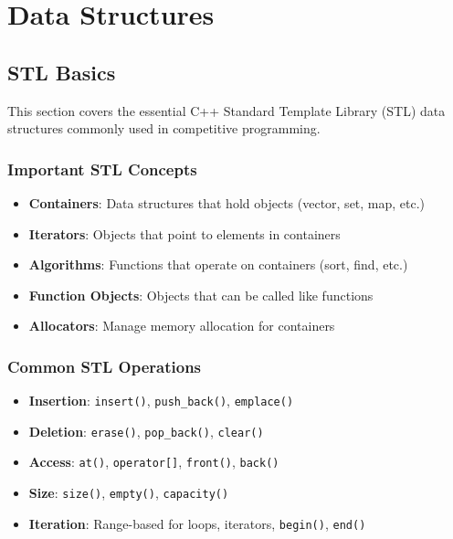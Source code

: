 \documentclass[11pt,a4paper]{article}
\begin{document}
\newpage

\section{Data Structures}

\subsection{STL Basics}
This section covers the essential C++ Standard Template Library (STL) data structures commonly used in competitive programming.

\subsubsection{Important STL Concepts}

\begin{itemize}
\item \textbf{Containers}: Data structures that hold objects (vector, set, map, etc.)
\item \textbf{Iterators}: Objects that point to elements in containers
\item \textbf{Algorithms}: Functions that operate on containers (sort, find, etc.)
\item \textbf{Function Objects}: Objects that can be called like functions
\item \textbf{Allocators}: Manage memory allocation for containers
\end{itemize}

\subsubsection{Common STL Operations}
\begin{itemize}
\item \textbf{Insertion}: \texttt{insert()}, \texttt{push\_back()}, \texttt{emplace()}
\item \textbf{Deletion}: \texttt{erase()}, \texttt{pop\_back()}, \texttt{clear()}
\item \textbf{Access}: \texttt{at()}, \texttt{operator[]}, \texttt{front()}, \texttt{back()}
\item \textbf{Size}: \texttt{size()}, \texttt{empty()}, \texttt{capacity()}
\item \textbf{Iteration}: Range-based for loops, iterators, \texttt{begin()}, \texttt{end()}
\end{itemize}
\end{document}
